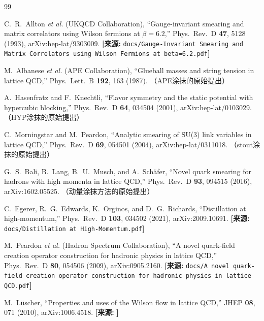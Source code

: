 \documentclass[12pt,a4paper]{ctexart}
\theoremstyle{definition}
\begin{document}
\begin{thebibliography}{99}


C.~R.~Allton \textit{et al.} (UKQCD Collaboration),
``Gauge-invariant smearing and matrix correlators using Wilson fermions at $\beta=6.2$,''
Phys.\ Rev.\ D \textbf{47}, 5128 (1993), arXiv:hep-lat/9303009.
\quad\textbf{[来源:} \texttt{docs/Gauge-Invariant Smearing and Matrix Correlators using Wilson Fermions at beta=6.2.pdf}\textbf{]}

M.~Albanese \textit{et al.} (APE Collaboration),
``Glueball masses and string tension in lattice QCD,''
Phys.\ Lett.\ B \textbf{192}, 163 (1987).
\quad（APE涂抹的原始提出）

A.~Hasenfratz and F.~Knechtli,
``Flavor symmetry and the static potential with hypercubic blocking,''
Phys.\ Rev.\ D \textbf{64}, 034504 (2001), arXiv:hep-lat/0103029.
\quad（HYP涂抹的原始提出）

C.~Morningstar and M.~Peardon,
``Analytic smearing of SU(3) link variables in lattice QCD,''
Phys.\ Rev.\ D \textbf{69}, 054501 (2004), arXiv:hep-lat/0311018.
\quad（stout涂抹的原始提出）


G.~S.~Bali, B.~Lang, B.~U.~Musch, and A.~Sch\"afer,
``Novel quark smearing for hadrons with high momenta in lattice QCD,''
Phys.\ Rev.\ D \textbf{93}, 094515 (2016), arXiv:1602.05525.
\quad（动量涂抹方法的原始提出）

C.~Egerer, R.~G.~Edwards, K.~Orginos, and D.~G.~Richards,
``Distillation at high-momentum,''
Phys.\ Rev.\ D \textbf{103}, 034502 (2021), arXiv:2009.10691.
\quad\textbf{[来源:} \texttt{docs/Distillation at High-Momentum.pdf}\textbf{]}

M.~Peardon \textit{et al.} (Hadron Spectrum Collaboration),
``A novel quark-field creation operator construction for hadronic physics in lattice QCD,''
Phys.\ Rev.\ D \textbf{80}, 054506 (2009), arXiv:0905.2160.
\quad\textbf{[来源:} \texttt{docs/A novel quark-field creation operator construction for hadronic physics in lattice QCD.pdf}\textbf{]}


M.~L\"uscher,
``Properties and uses of the Wilson flow in lattice QCD,''
JHEP \textbf{08}, 071 (2010), arXiv:1006.4518.
\quad\textbf{[来源:} \texttt{}\textbf{]}


\end{thebibliography}
\end{document}

